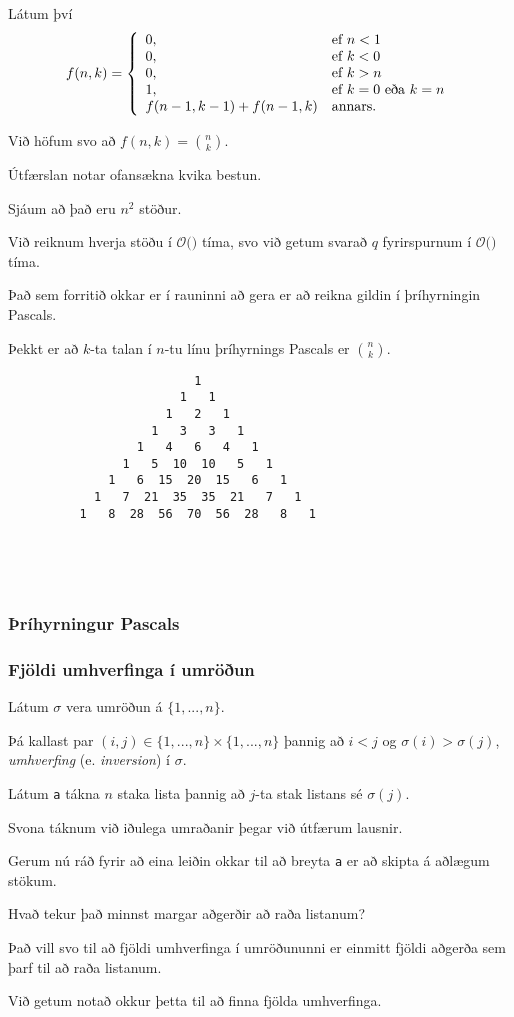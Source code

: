 {
	{
		\item<1-> Látum því
		\[
			f(n, k) = \left \{
			\env{array}
			{ {l l}
				0, & \text{ef $n < 1$}\\
				0, & \text{ef $k < 0$}\\
				0, & \text{ef $k > n$}\\
				1, & \text{ef $k = 0$ eða $k = n$}\\
				f(n - 1, k - 1) + f(n - 1, k) & \text{annars.}
			}
			\right .
		\]
		\item<2-> Við höfum svo að $f(n, k) = {n \choose k}$.
		\item<3-> Útfærslan notar ofansækna kvika bestun.
	}
}

{
}

{
	{
		\item<1-> Sjáum að það eru $n^2$ stöður.
		\item<2-> Við reiknum hverja stöðu í $\mathcal{O}($$)$ tíma, svo við getum svarað $q$ fyrirspurnum í
					$\mathcal{O}($\onslide<4->{$n^2 + q$}$)$ tíma.
		\item<5-> Það sem forritið okkar er í rauninni að gera er að reikna gildin í þríhyrningin Pascals.
		\item<6-> Þekkt er að $k$-ta talan í $n$-tu línu þríhyrnings Pascals er ${n \choose k}$.
	}
}

{ \begin{verbatim}
                          1
                        1   1
                      1   2   1
                    1   3   3   1
                  1   4   6   4   1
                1   5  10  10   5   1
              1   6  15  20  15   6   1
            1   7  21  35  35  21   7   1
          1   8  28  56  70  56  28   8   1





\end{verbatim}}
{
	\frametitle{Þríhyrningur Pascals}
	\pascal
}

{
	\frametitle{Fjöldi umhverfinga í umröðun}
	{
		\item<1-> Látum $\sigma$ vera umröðun á $\{1, ..., n\}$.
		\item<2-> Þá kallast par $(i, j) \in \{1, ..., n\} \times \{1, ..., n\}$ þannig að $i < j$ og $\sigma(i) > \sigma(j)$,
					\emph{umhverfing} (e. \emph{inversion}) í $\sigma$.
		\item<3-> Látum \texttt{a} tákna $n$ staka lista þannig að $j$-ta stak listans sé $\sigma(j)$.
		\item<4-> Svona táknum við iðulega umraðanir þegar við útfærum lausnir.
		\item<5-> Gerum nú ráð fyrir að eina leiðin okkar til að breyta \texttt{a} er að skipta á aðlægum stökum.
		\item<6-> Hvað tekur það minnst margar aðgerðir að raða listanum?
		\item<7-> Það vill svo til að fjöldi umhverfinga í umröðununni er einmitt fjöldi aðgerða sem þarf til að raða listanum.
		\item<8-> Við getum notað okkur þetta til að finna fjölda umhverfinga.
	}
}

